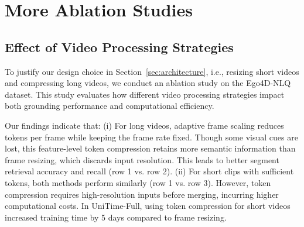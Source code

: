 \section{More Ablation Studies}
\label{sec:ablation}

\subsection{Effect of Video Processing Strategies}
\label{sub:input_process}
To justify our design choice in Section~\ref{sec:architecture}, i.e., resizing short videos and compressing long videos, we conduct an ablation study on the Ego4D-NLQ dataset. This study evaluates how different video processing strategies impact both grounding performance and computational efficiency.

\begin{table}[h]
\caption{
\textbf{Ablation on video processing strategies.} Seg Retrieval Acc. indicates the accuracy of coarse-grained segment retireval.}
\vspace{3pt}
\centering
{}
\label{tab:ablation_process}
\end{table}

Our findings indicate that: (i) For long videos, adaptive frame scaling reduces tokens per frame while keeping the frame rate fixed. Though some visual cues are lost, this feature-level token compression retains more semantic information than frame resizing, which discards input resolution. This leads to better segment retrieval accuracy and recall (row 1 vs. row 2). (ii) For short clips with sufficient tokens, both methods perform similarly (row 1 vs. row 3). However, token compression requires high-resolution inputs before merging, incurring higher computational costs. In UniTime-Full, using token compression for short videos increased training time by 5 days compared to frame resizing. 

